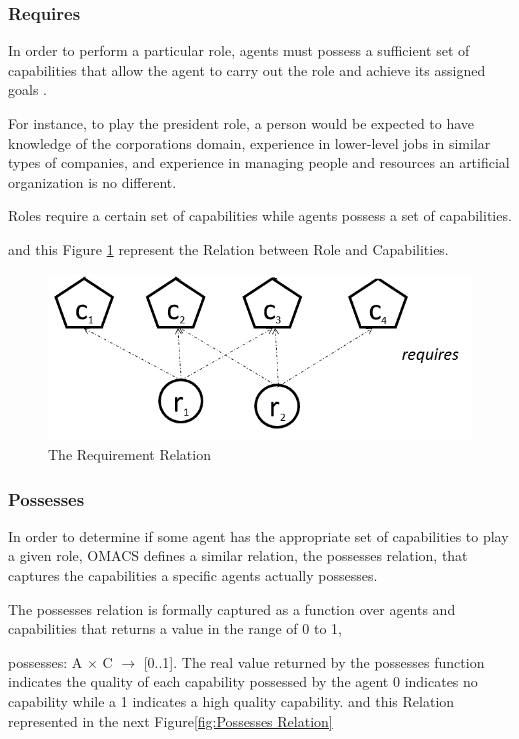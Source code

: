 \subsubsection{Requires}

In order to perform a particular role, agents must possess a sufficient set of capabilities that allow
the agent to carry out the role and achieve its assigned goals \cite{omacs2}.

For instance, to play the president role,
 a person would be expected to have knowledge of the corporations domain, experience in
lower-level jobs in similar types of companies, and experience in managing people and resources 
an artificial organization is no different. 

Roles require a certain set of capabilities while agents
possess a set of capabilities\cite{omacs2}.


and this Figure \ref{fig:The Requirment Relation} represent the Relation between Role and Capabilities.

\begin{figure}[th]
	\centering
		\includegraphics[scale=0.5]{ch1/img/RelRequire}
	\caption{\label{fig:The Requirment Relation}The Requirement Relation}
\end{figure}

\subsubsection{Possesses}
In order to determine if some agent has the appropriate set of capabilities to play a given role, OMACS defines a similar relation, the possesses relation, that captures the capabilities a specific agents actually possesses\cite{omacs4}.

The possesses relation is formally captured as a function over agents and capabilities that returns a value in the range of 0 to 1,

possesses: A $\times$ C $\rightarrow$ [0..1]. The real value returned by the possesses function indicates the quality of each capability possessed by the agent 0 indicates no capability while a 1 indicates a high quality capability\cite{omacs4}.
and this Relation represented in the next Figure\ref{fig:Possesses Relation}


